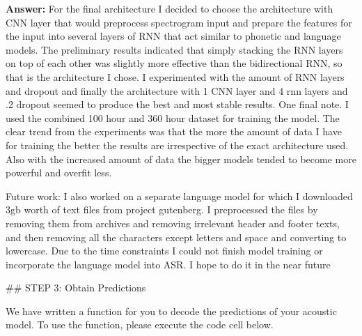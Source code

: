 \documentclass[11pt]{article}
\begin{document}
\textbf{Answer:} For the final architecture I decided to choose the
architecture with CNN layer that would preprocess spectrogram input and
prepare the features for the input into several layers of RNN that act
similar to phonetic and language models. The preliminary results
indicated that simply stacking the RNN layers on top of each other was
slightly more effective than the bidirectional RNN, so that is the
architecture I chose. I experimented with the amount of RNN layers and
dropout and finally the architecture with 1 CNN layer and 4 rnn layers
and .2 dropout seemed to produce the best and most stable results. One
final note. I used the combined 100 hour and 360 hour dataset for
training the model. The clear trend from the experiments was that the
more the amount of data I have for training the better the results are
irrespective of the exact architecture used. Also with the increased
amount of data the bigger models tended to become more powerful and
overfit less.

Future work: I also worked on a separate language model for which I
downloaded 3gb worth of text files from project gutenberg. I
preprocessed the files by removing them from archives and removing
irrelevant header and footer texts, and then removing all the characters
except letters and space and converting to lowercase. Due to the time
constraints I could not finish model training or incorporate the
language model into ASR. I hope to do it in the near future

     \#\# STEP 3: Obtain Predictions

We have written a function for you to decode the predictions of your
acoustic model. To use the function, please execute the code cell below.
\end{document}
